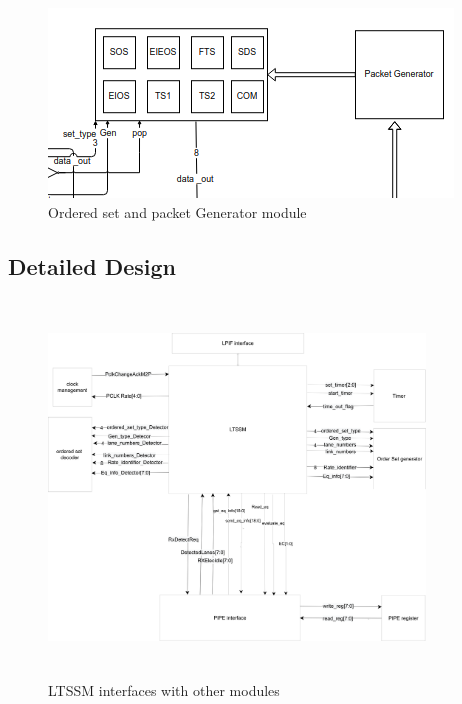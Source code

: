 \begin{figure}[H]
  \centering
  \includegraphics{images/ordered_set.png}
  \caption{Ordered set and packet Generator module}
\end{figure}





\subsection{Detailed Design}
\begin{figure}[H]
  \centering
  \includegraphics[height=100mm,width=100mm]{images/design-internal_signal.png}
  \caption{LTSSM interfaces with other modules}
\end{figure}
